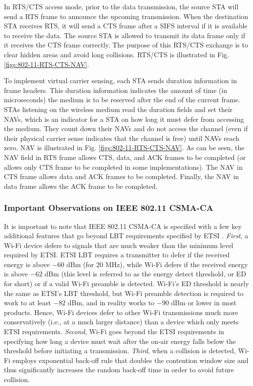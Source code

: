 \documentclass[journal,draftclsnofoot,12pt,onecolumn]{IEEEtran}
\begin{document}
In RTS/CTS access mode, prior to the data transmission, the source STA will send a RTS frame to announce the upcoming transmission. When the destination STA receives RTS, it will send a CTS frame after a SIFS interval if it is available to receive the data. The source STA is allowed to transmit its data frame only if it receives the CTS frame correctly. The purpose of this RTS/CTS exchange is to clear hidden areas and avoid long collisions. RTS/CTS is illustrated in Fig. \ref{figs:802-11-RTS-CTS-NAV}.

To implement virtual carrier sensing, each STA sends duration information in frame headers. This duration information indicates the amount of time (in microseconds) the medium is to be reserved after the end of the current frame. STAs listening on the wireless medium read the duration fields and set their NAVs, which is an indicator for a STA on how long it must defer from accessing the medium. They count down their NAVs and do not access the channel (even if their physical carrier sense indicates that the channel is free) until NAVs reach zero. NAV is illustrated in Fig. \ref{figs:802-11-RTS-CTS-NAV}. As can be seen, the NAV field in RTS frame allows CTS, data, and ACK frames to be completed (or allows only CTS frame to be completed in some implementations). The NAV in CTS frame allows data and ACK frames to be completed. Finally, the NAV in data frame allows the ACK frame to be completed.

\subsubsection{Important Observations on IEEE 802.11 CSMA-CA}

It is important to note that IEEE 802.11 CSMA-CA is specified with a few key additional features that go beyond LBT requirements specified by ETSI \cite{LBT-ETSI-2014}. \textit{First}, a Wi-Fi device defers to signals that are much weaker than the minimum level required by ETSI. ETSI LBT requires a transmitter to defer if the received energy is above $-60$ dBm (for $20$ MHz), while Wi-Fi defers if the received energy is above $-62$ dBm (this level is referred to as the energy detect threshold, or ED for short) or if a valid Wi-Fi preamble is detected. Wi-Fi's ED threshold is nearly the same as ETSI's LBT threshold, but Wi-Fi preamble detection is required to work to at least $-82$ dBm, and in reality works to $-90$ dBm or lower in most products. Hence, Wi-Fi devices defer to other Wi-Fi transmissions much more conservatively (i.e., at a much larger distance) than a device which only meets ETSI requirements. \textit{Second}, Wi-Fi goes beyond the ETSI requirements in specifying how long a device must wait after the on-air energy falls below the threshold before initiating a transmission. \textit{Third}, when a collision is detected, Wi-Fi employs exponential back-off rule that doubles the contention window size and thus significantly increases the random back-off time in order to avoid future collision.
\end{document}
